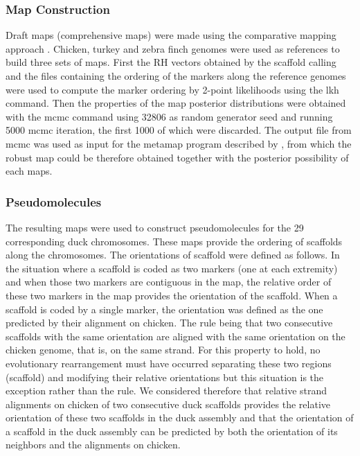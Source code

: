\documentclass[10pt,letterpaper]{article}
\begin{document}
\subsubsection*{Map Construction}
Draft maps (comprehensive maps) were made using the comparative mapping approach \cite{Faraut2007}. Chicken, turkey and zebra finch genomes were used as references to build three sets of maps. First the RH vectors obtained by the scaffold calling and the files containing the ordering of the markers along the reference genomes were used to compute the marker ordering by 2-point likelihoods using the lkh command. Then the properties of the map posterior distributions were obtained with the mcmc command using 32806 as random generator seed and running 5000 mcmc iteration, the first 1000 of which were discarded. The output file from mcmc was used as input for the metamap program described by \cite{Servin2010}, from which the robust map could be therefore obtained together with the posterior possibility of each maps. 

\subsubsection*{Pseudomolecules}
The resulting maps were used to construct pseudomolecules for the 29 corresponding duck chromosomes. These maps provide the ordering of scaffolds along the chromosomes. The orientations of scaffold were defined as follows. In the situation where a scaffold is coded as two markers (one at each extremity) and when those two markers are contiguous in the map, the relative order of these two markers in the map provides the orientation of the scaffold. When a scaffold is coded by a single marker, the orientation was defined as the one predicted by their alignment on chicken. The rule being that two consecutive scaffolds with the same orientation are aligned with the same orientation on the chicken genome, that is, on the same strand. For this property to hold, no evolutionary rearrangement must have occurred separating these two regions (scaffold) and modifying their relative orientations but this situation is the exception rather than the rule. We considered therefore that relative strand alignments on chicken of two consecutive duck scaffolds provides the relative orientation of these two scaffolds in the duck assembly and that the orientation of a scaffold in the duck assembly can be predicted by both the orientation of its neighbors and the alignments on chicken.   
\end{document}
